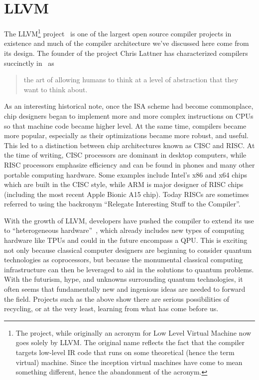 \section{LLVM}\label{sec:llvm}

The LLVM\footnote{The project, while originally an acronym for Low Level Virtual Machine now goes solely by LLVM. The original name reflects the fact that the compiler targets low-level \ac{IR} code that runs on some theoretical (hence the term virtual) machine. Since the inception virtual machines have come to mean something different, hence the abandonment of the acronym.} project~\cite{llvm} is one of the largest open source compiler projects in existence and much of the compiler architecture we've discussed here come from its design.
The founder of the project Chris Lattner has characterized compilers succinctly in~\cite{lattnerquote} as
\begin{quote}
    the art of allowing humans to think at a level of abstraction that they want to think about.
\end{quote}

As an interesting historical note, once the \ac{ISA} scheme had become commonplace, chip designers began to implement more and more complex instructions on \acp{CPU} so that machine code became higher level.
At the same time, compilers became more popular, especially as their optimizations became more robust, and useful.
This led to a distinction between chip architectures known as \ac{CISC} and \ac{RISC}.
At the time of writing, \ac{CISC} processors are dominant in desktop computers, while \ac{RISC} processors emphasize efficiency and can be found in phones and many other portable computing hardware.
Some examples include Intel's x86 and x64 chips which are built in the \ac{CISC} style, while ARM is major designer of \ac{RISC} chips (including the most recent Apple Bionic A15 chip). %
Today \acp{RISC} are sometimes referred to using the backronym ``Relegate Interesting Stuff to the Compiler''.

With the growth of LLVM, developers have pushed the compiler to extend its use to ``heterogeneous hardware''~\cite{mlir}, which already includes new types of computing hardware like \acp{TPU} and could in the future encompass a \ac{QPU}.
This is exciting not only because classical computer designers are beginning to consider quantum technologies as coprocessors, but because the monumental classical computing infrastructure can then be leveraged to aid in the solutions to quantum problems.
With the futurism, hype, and unknowns surrounding quantum technologies, it often seems that fundamentally new and ingenious ideas are needed to forward the field.
Projects such as the above show there are serious possibilities of recycling, or at the very least, learning from what has come before us.
